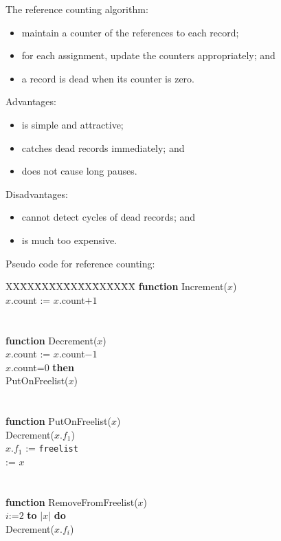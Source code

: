 \begin{slide*}
The reference counting algorithm:

\begin{itemize}
\item maintain a counter of the references to each record;
\item for each assignment, update the counters appropriately; and
\item a record is dead when its counter is zero.
\end{itemize}

Advantages:

\begin{itemize}
\item is simple and attractive;
\item catches dead records immediately; and
\item does not cause long pauses.
\end{itemize}

Disadvantages:

\begin{itemize}
\item cannot detect cycles of dead records; and
\item is much too expensive.
\end{itemize}

\vfil
\end{slide*}
 
\begin{slide*}
Pseudo code for reference counting:\\

\begin{tabbing}
XX\=XX\=XX\=XX\=XX\=XX\=XX\=XX\=XX\=\kill
{\bf function} Increment($x$)\\
\>$x$.count := $x$.count$+1$\\
\\
\\
{\bf function} Decrement($x$)\\
\>$x$.count := $x$.count$-1$\\
 $x$.count=0 {\bf then}\\
\>\>PutOnFreelist($x$)\\
\\
\\
{\bf function} PutOnFreelist($x$)\\
\>Decrement($x.f_1$)\\
\>$x.f_1$ := {\tt freelist}\\
 := $x$\\
\\
\\
{\bf function} RemoveFromFreelist($x$)\\
 $i$:=$2$ {\bf to} $|x|$ {\bf do}\\
\>\>Decrement($x.f_i$)
\end{tabbing}
\vfil
\end{slide*}
 
